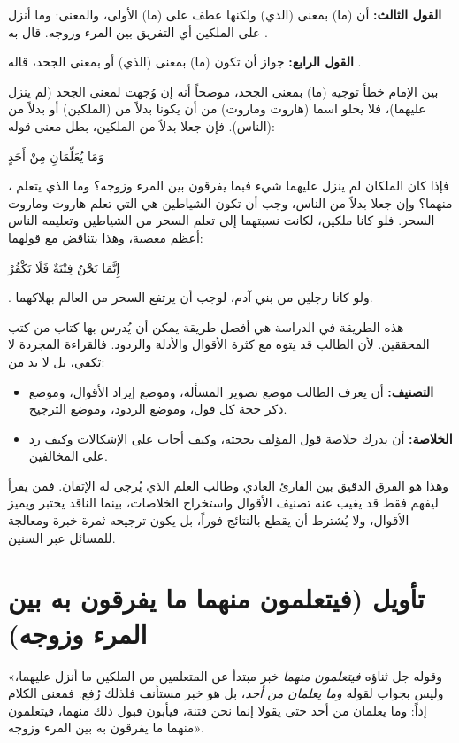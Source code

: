 \textbf{القول الثالث:} أن (ما) بمعنى (الذي) ولكنها عطف على (ما) الأولى، والمعنى: وما أنزل على الملكين أي التفريق بين المرء وزوجه. قال به .

\textbf{القول الرابع:} جواز أن تكون (ما) بمعنى (الذي) أو بمعنى الجحد، قاله .

\begin{fawaid}
بين الإمام  خطأ توجيه (ما) بمعنى الجحد، موضحاً أنه إن وُجهت لمعنى الجحد (لم ينزل عليهما)، فلا يخلو اسما (هاروت وماروت) من أن يكونا بدلاً من (الملكين) أو بدلاً من (الناس). 
فإن جعلا بدلاً من الملكين، بطل معنى قوله: \begin{ayah}وَمَا يُعَلِّمَانِ مِنْ أَحَدٍ\end{ayah}، فإذا كان الملكان لم ينزل عليهما شيء فبما يفرقون بين المرء وزوجه؟ وما الذي يتعلم منهما؟
وإن جعلا بدلاً من الناس، وجب أن تكون الشياطين هي التي تعلم هاروت وماروت السحر. فلو كانا ملكين، لكانت نسبتهما إلى تعلم السحر من الشياطين وتعليمه الناس أعظم معصية، وهذا يتناقض مع قولهما: \begin{ayah}إِنَّمَا نَحْنُ فِتْنَةٌ فَلَا تَكْفُرْ\end{ayah}. ولو كانا رجلين من بني آدم، لوجب أن يرتفع السحر من العالم بهلاكهما.
\end{fawaid}

\begin{fawaid}
هذه الطريقة في الدراسة هي أفضل طريقة يمكن أن يُدرس بها كتاب من كتب المحققين. لأن الطالب قد يتوه مع كثرة الأقوال والأدلة والردود. فالقراءة المجردة لا تكفي، بل لا بد من:
\begin{itemize}
    \item \textbf{التصنيف:} أن يعرف الطالب موضع تصوير المسألة، وموضع إيراد الأقوال، وموضع ذكر حجة كل قول، وموضع الردود، وموضع الترجيح.
    \item \textbf{الخلاصة:} أن يدرك خلاصة قول المؤلف بحجته، وكيف أجاب على الإشكالات وكيف رد على المخالفين.
\end{itemize}
وهذا هو الفرق الدقيق بين القارئ العادي وطالب العلم الذي يُرجى له الإتقان. فمن يقرأ ليفهم فقط قد يغيب عنه تصنيف الأقوال واستخراج الخلاصات، بينما الناقد يختبر ويميز الأقوال، ولا يُشترط أن يقطع بالنتائج فوراً، بل يكون ترجيحه ثمرة خبرة ومعالجة للمسائل عبر السنين.
\end{fawaid}

\separator

\section{تأويل (فيتعلمون منهما ما يفرقون به بين المرء وزوجه)}
 «وقوله جل ثناؤه \textit{فيتعلمون منهما} خبر مبتدأ عن المتعلمين من الملكين ما أنزل عليهما، وليس بجواب لقوله \textit{وما يعلمان من أحد}، بل هو خبر مستأنف فلذلك رُفع. فمعنى الكلام إذاً: وما يعلمان من أحد حتى يقولا إنما نحن فتنة، فيأبون قبول ذلك منهما، فيتعلمون منهما ما يفرقون به بين المرء وزوجه».

